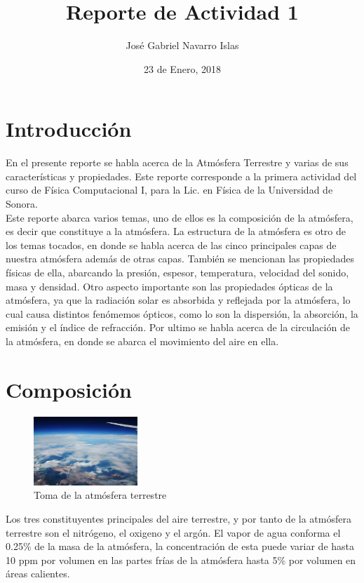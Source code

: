 \documentclass{article} %
\title{Reporte de Actividad 1}
\author{José Gabriel Navarro Islas}
\date{23 de Enero, 2018}
\begin{document}
\maketitle 

\section{Introducción}
En el presente reporte se habla acerca de la Atmósfera Terrestre y varias de sus características y propiedades. Este reporte corresponde a la primera actividad del curso de Física Computacional I, para la Lic. en Física de la Universidad de Sonora. \\

Este reporte abarca varios temas, uno de ellos es la composición de la atmósfera, es decir que constituye a la atmósfera. La estructura de la atmósfera es otro de los temas tocados, en donde se habla acerca de las cinco principales capas de nuestra atmósfera además de otras capas. También se mencionan las propiedades físicas de ella, abarcando la presión, espesor, temperatura, velocidad del sonido, masa y densidad. Otro aspecto importante son las propiedades ópticas de la atmósfera, ya que la radiación solar es absorbida y reflejada por la atmósfera, lo cual causa distintos fenómemos ópticos, como lo son la dispersión, la absorción, la emisión y el índice de refracción. Por ultimo se habla acerca de la circulación de la atmósfera, en donde se abarca el movimiento del aire en ella.

\section{Composición}

\begin{figure}
    \centering
    \includegraphics[width=0.35\textwidth]{atm1.jpg}
    \caption{Toma de la atmósfera terrestre}
\end{figure}

Los tres constituyentes principales del aire terrestre, y por tanto de la atmósfera terrestre son el nitrógeno, el oxigeno y el argón. El vapor de agua conforma el 0.25\% de la masa de la atmósfera, la concentración de esta puede variar de hasta 10 ppm por volumen en las partes frías de la atmósfera hasta 5\% por volumen en áreas calientes. \\
\end{document}
